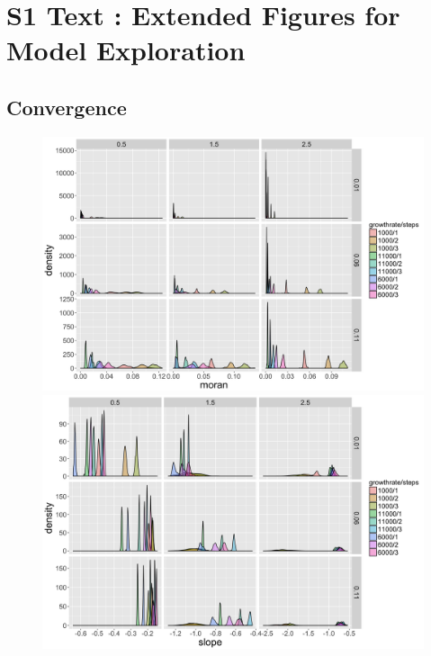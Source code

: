 



\section*{S1 Text : Extended Figures for Model Exploration}


\subsection*{Convergence}





\begin{figure}
\centering
\includegraphics[width=\textwidth]{figuresraw/hist_moran}\\
\includegraphics[width=\textwidth]{figuresraw/hist_slope}
\caption{}
\label{}
\end{figure}






